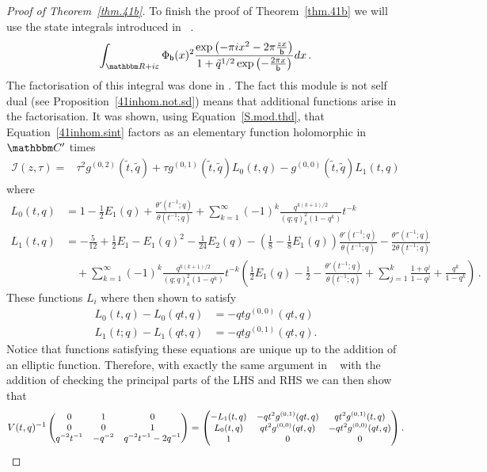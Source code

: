 \documentclass[12pt,reqno]{amsart}
\theoremstyle{definition}
\def\BR{\mathbbm R}
\def\BC{\mathbbm C}
\def\calI{\mathcal I}
\def\tq{\tilde{q}}
\def\ve{\varepsilon}
\def\be{\begin{equation}}
\def\ee{\end{equation}}
\def\sfb{\mathsf{b}}
\def\e{\bold e}
\def\sfb{\mathsf{b}}
\begin{document}
\begin{proof}[Proof of Theorem~\ref{thm.41b}]
To finish the proof of
Theorem~\ref{thm.41b} we will use the state integrals introduced in
~\cite[Eqn.(73)]{GGMW:trivial}.
\be\label{41inhom.sint}
\int_{\BR+i\ve}
\Phi_{\sfb}(x)^2
\frac{\exp\left(-\pi i x^{2}-2\pi\frac{zx}{\sfb}\right)}{1+\tq^{1/2}
  \exp\left(-\frac{2\pi x}{\sfb}\right)}dx\,.
\ee
The factorisation of this integral was done in \cite[Thm.7]{GGMW:trivial}. The
fact this module is not self dual (see Proposition~\ref{41inhom.not.sd}) means
that additional functions arise in the factorisation. It was shown, using
Equation~\eqref{S.mod.thd}, that Equation~\eqref{41inhom.sint} factors as an
elementary function holomorphic in $\BC'$ times
\be
\begin{aligned}
\calI(z,\tau)
=&
\tau^{2}g^{(0,2)}(\tilde{t},\tq)
+\tau g^{(0,1)}(\tilde{t},\tq)L_{0}(t,q)-g^{(0,0)}(\tilde{t},\tq)L_{1}(t,q)
\end{aligned}
\ee
where
\be
\label{41.stateint.fac.inhom}
\begin{aligned}
L_{0}(t,q)
&=
1-\frac{1}{2}E_{1}(q)+\frac{\theta'(t^{-1};q)}{\theta(t^{-1};q)}
+\sum_{k=1}^{\infty}(-1)^{k}\frac{q^{k(k+1)/2}}{(q;q)_{k}^{2}(1-q^{k})}t^{-k}\\
L_{1}(t,q)
&=
-\frac{5}{12}+\frac{1}{2}E_{1}-E_{1}(q)^{2}-\frac{1}{24}E_{2}(q)
-\left(\frac{1}{8}-\frac{1}{8}E_{1}(q)\right)\frac{\theta'(t^{-1};q)}{\theta(t^{-1};q)}
-\frac{\theta''(t^{-1};q)}{2\theta(t^{-1};q)}\\
&\quad+\sum_{k=1}^{\infty}(-1)^{k}
\frac{q^{k(k+1)/2}}{(q;q)_{k}^{2}(1-q^{k})}t^{-k}
\left(\frac{1}{2}E_{1}(q)-\frac{1}{2}-\frac{\theta'(t^{-1};q)}{\theta(t^{-1};q)}+\sum_{j=1}^{k}\frac{1+q^{j}}{1-q^{j}}
  +\frac{q^{k}}{1-q^{k}}\right)\,.
\end{aligned}
\ee
These functions $L_{i}$ where then shown to satisfy
\be
\begin{aligned}
  L_{0}(t,q)-L_{0}(qt,q)&=-qtg^{(0,0)}(qt,q)\\
  L_{1}(t;q)-L_{1}(qt,q)&=-qtg^{(0,1)}(qt,q).
\end{aligned}
\ee
Notice that functions satisfying these equations are unique up to the
addition of an elliptic function. Therefore, with exactly the same argument in
~\cite[Thm.4]{GGMW:trivial} with the addition of checking the principal parts
of the LHS and RHS we can then show that
\be
{\small
V(t,q)^{-1}
\begin{pmatrix}
0 & 1 & 0\\
0 & 0 & 1\\
q^{-2}t^{-1} & -q^{-2} & q^{-2}t^{-1}-2q^{-1}
\end{pmatrix}
=
\begin{pmatrix}
  -L_{1}(t,q) & -qt^2g^{(0,1)}(qt,q) & qt^2g^{(0,1)}(t,q)\\
  L_{0}(t,q)& qt^2g^{(0,0)}(qt,q) & -qt^2g^{(0,0)}(qt,q)\\
  1 & 0 & 0
\end{pmatrix}.
}
\ee


\end{proof}
\end{document}
